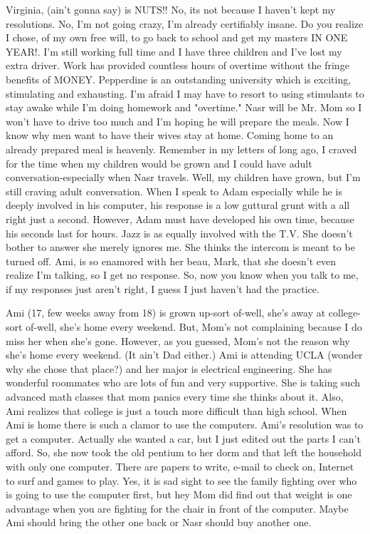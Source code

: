 Virginia, (ain't gonna say) is NUTS!! No, its not because I haven't kept my resolutions. No, I'm not going crazy, I'm already certifiably
insane. Do you realize I chose, of my own free will, to go back to school and get my masters IN ONE YEAR!. I'm still working full time and I
have three children and I've lost my extra driver. Work has provided countless hours of overtime without the fringe benefits of MONEY.
Pepperdine is an outstanding university which is exciting, stimulating and exhausting. I'm afraid I may have to resort to using stimulants to
stay awake while I'm doing homework and "overtime." Nasr will be Mr. Mom so I won't have to drive too much and I'm hoping he will prepare the
meals. Now I know why men want to have their wives stay at home. Coming home to an already prepared meal is heavenly. Remember in my letters of
long ago, I craved for the time when my children would be grown and I could have adult conversation-especially when Nasr travels. Well, my
children have grown, but I'm still craving adult conversation. When I speak to Adam especially while he is deeply involved in his computer, his
response is a low guttural grunt with a all right just a second. However, Adam must have developed his own time, because his seconds last for
hours. Jazz is as equally involved with the T.V. She doesn't bother to answer she merely ignores me. She thinks the intercom is meant to be
turned off. Ami, is so enamored with her beau, Mark, that she doesn't even realize I'm talking, so I get no response. So, now you know when you
talk to me, if my responses just aren't right, I guess I just haven't had the practice.

Ami (17, few weeks away from 18) is grown up-sort of-well, she's away at college-sort of-well, she's home every weekend. But, Mom's not
complaining because I do miss her when she's gone. However, as you guessed, Mom's not the reason why she's home every weekend. (It ain't Dad
either.) Ami is attending UCLA (wonder why she chose that place?) and her major is electrical engineering. She has wonderful roommates who are
lots of fun and very supportive. She is taking such advanced math classes that mom panics every time she thinks about it. Also, Ami realizes
that college is just a touch more difficult than high school. When Ami is home there is such a clamor to use the computers. Ami's resolution was
to get a computer. Actually she wanted a car, but I just edited out the parts I can't afford. So, she now took the old pentium to her dorm and
that left the household with only one computer. There are papers to write, e-mail to check on, Internet to surf and games to play. Yes, it is
sad sight to see the family fighting over who is going to use the computer first, but hey Mom did find out that weight is one advantage when you
are fighting for the chair in front of the computer. Maybe Ami should bring the other one back or Nasr should buy another one.

